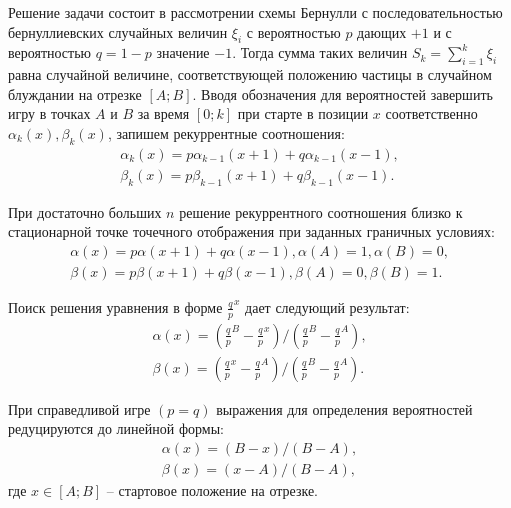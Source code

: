 Решение задачи состоит в рассмотрении схемы Бернулли с последовательностью бернуллиевских случайных величин $\xi_i$ с вероятностью $p$ дающих $+1$ и с вероятностью $q=1-p$ значение $-1$. Тогда сумма таких величин $S_k=\sum_{i=1}^{k} \xi_i$ равна случайной величине, соответствующей положению частицы в случайном блуждании на отрезке $[A; B]$. Вводя обозначения для вероятностей завершить игру в точках $A$ и $B$ за время $[0; k]$ при старте в позиции $x$ соответственно $\alpha_k(x), \beta_k(x)$, запишем рекуррентные соотношения:
\begin{equation}
    \label{eq:eq1}
    \begin{alignedat}{2}
        \alpha_k(x) = p\alpha_{k-1}(x+1)+q\alpha_{k-1}(x-1),\\
        \beta_k(x) = p\beta_{k-1}(x+1)+q\beta_{k-1}(x-1).
    \end{alignedat}
\end{equation}

При достаточно больших $n$ решение рекуррентного соотношения близко к стационарной точке точечного отображения при заданных граничных условиях:
\begin{equation}
    \label{eq:eq2}
    \begin{alignedat}{2}
        \alpha(x) = p\alpha(x+1)+q\alpha(x-1), \alpha(A)=1, \alpha(B)=0,\\
        \beta(x) = p\beta(x+1)+q\beta(x-1), \beta(A)=0, \beta(B)=1.
    \end{alignedat}
\end{equation}

Поиск решения уравнения в форме $\frac{q}{p}^{x}$ дает следующий результат:
\begin{equation}
    \label{eq:eq3}
    \begin{alignedat}{2}
        \alpha(x) = \left (\frac{q}{p}^B-\frac{q}{p}^x\right )/\left (\frac{q}{p}^B-\frac{q}{p}^A\right ),\\
        \beta(x) = \left (\frac{q}{p}^x-\frac{q}{p}^A\right )/\left (\frac{q}{p}^B-\frac{q}{p}^A\right ).
    \end{alignedat}
\end{equation}

При справедливой игре $(p=q)$ выражения для определения вероятностей редуцируются до линейной формы:
\begin{equation}
    \label{eq:eq4}
    \begin{alignedat}{2}
        \alpha(x) = \left (B-x\right )/\left (B-A\right ),\\
        \beta(x) = \left (x-A\right )/\left (B-A\right ),
    \end{alignedat}
\end{equation}
где $x \in [A; B]$ -- стартовое положение на отрезке.

